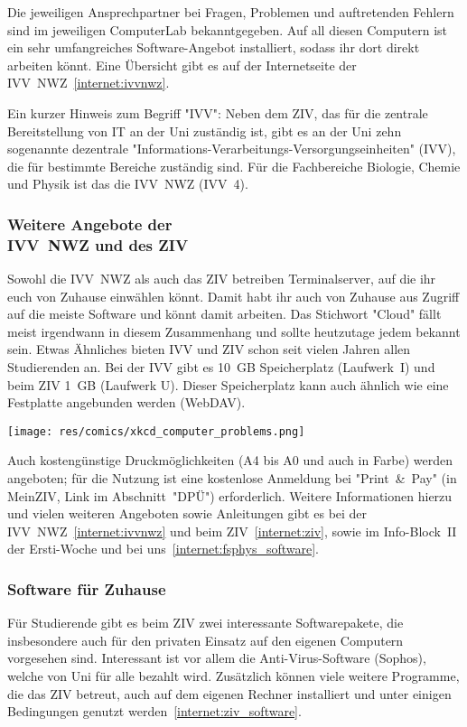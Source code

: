 \begin{multicols}{2}
Die jeweiligen Ansprechpartner bei Fragen, Problemen und auftretenden Fehlern sind im jeweiligen ComputerLab bekanntgegeben. Auf all diesen Computern ist ein sehr umfangreiches Software-Angebot installiert, sodass ihr dort direkt arbeiten könnt. Eine Übersicht gibt es auf der Internetseite der IVV~NWZ~\cref{internet:ivvnwz}.

Ein kurzer Hinweis zum Begriff "IVV": Neben dem ZIV, das für die zentrale Bereitstellung von IT an der Uni zuständig ist, gibt es an der Uni zehn  sogenannte dezentrale "Informations-Verarbeitungs-Versorgungseinheiten" (IVV), die für bestimmte Bereiche zuständig sind. Für die Fachbereiche Biologie, Chemie und Physik ist das die IVV~NWZ (IVV~4).

\subsubsection*{Weitere Angebote der\\IVV~NWZ und des ZIV}
Sowohl die IVV~NWZ als auch das ZIV betreiben Terminalserver, auf die ihr euch von Zuhause einwählen könnt. Damit habt ihr auch von Zuhause aus Zugriff auf die meiste Software und könnt damit arbeiten. Das Stichwort "Cloud" fällt meist irgendwann in diesem Zusammenhang und sollte heutzutage jedem bekannt sein. Etwas Ähnliches bieten IVV und ZIV schon seit vielen Jahren allen Studierenden an. Bei der IVV gibt es 10~GB Speicherplatz (Laufwerk~I) und beim ZIV 1~GB (Laufwerk U). Dieser Speicherplatz kann auch ähnlich wie eine Festplatte angebunden werden (WebDAV).

\texttt{[image: res/comics/xkcd\_computer\_problems.png]}

Auch kostengünstige Druckmöglichkeiten (A4 bis A0 und auch in Farbe) werden angeboten; für die Nutzung ist eine kostenlose Anmeldung bei "Print~\&~Pay" (in MeinZIV, Link im Abschnitt~"DPÜ") erforderlich. Weitere Informationen hierzu und vielen weiteren Angeboten sowie Anleitungen gibt es bei der IVV~NWZ~\cref{internet:ivvnwz} und beim ZIV~\cref{internet:ziv}, sowie im Info-Block~II der Ersti-Woche und bei uns~\cref{internet:fsphys_software}.

\subsubsection*{Software für Zuhause}
Für Studierende gibt es beim ZIV zwei interessante Softwarepakete, die insbesondere auch für den privaten Einsatz auf den eigenen Computern vorgesehen sind. Interessant ist vor allem die Anti-Virus-Software (Sophos), welche von Uni für alle bezahlt wird. Zusätzlich können viele weitere Programme, die das ZIV betreut, auch auf dem eigenen Rechner installiert und unter einigen Bedingungen genutzt werden~\cref{internet:ziv_software}.


\end{multicols}
